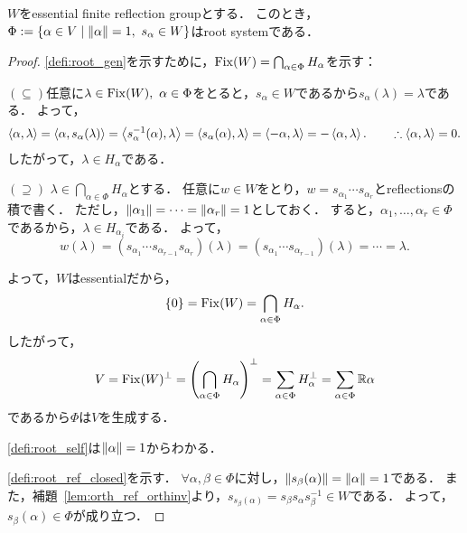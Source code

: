 \begin{prop} \label{prop:frg_to_root}
  $W$をessential finite reflection groupとする．
  このとき，$\Phi := \set{\alpha \in V}{\norm{\alpha} = 1,\ s_\alpha \in W}$はroot systemである．
\end{prop}
\begin{proof}
  \ref{defi:root_gen}を示すために，$\operatorname{Fix} (W) = \bigcap_{\alpha \in \Phi} H_\alpha$を示す：

  $(\subseteq)$任意に$\lambda \in \operatorname{Fix}(W),\ \alpha \in \Phi$をとると，$s_\alpha \in W$であるから$s_\alpha(\lambda) = \lambda$である．
  よって，
  \begin{equation}
    \left\langle \alpha, \lambda \right\rangle
    = \left\langle \alpha, s_\alpha(\lambda) \right\rangle
    = \left\langle s_\alpha^{-1}(\alpha), \lambda \right\rangle
    = \left\langle s_\alpha(\alpha), \lambda \right\rangle
    = \left\langle -\alpha, \lambda \right\rangle
    = -\left\langle \alpha, \lambda \right\rangle.
    \qquad \therefore \left\langle \alpha, \lambda \right\rangle = 0.
  \end{equation}
  したがって，$\lambda \in H_\alpha$である．

  $(\supseteq)$ $\lambda \in \bigcap_{\alpha \in \Phi} H_\alpha$とする．
  任意に$w \in W$をとり，$w = s_{\alpha_1} \cdots s_{\alpha_r}$とreflectionsの積で書く．
  ただし，$\left\| \alpha_1 \right\| = \cdots = \left\| \alpha_r \right\| = 1$としておく．
  すると，$\alpha_1, \ldots, \alpha_r \in \Phi$であるから，$\lambda \in H_{\alpha_i}$である．
  よって，
  \begin{equation}
    w(\lambda)
    = (s_{\alpha_1} \cdots s_{\alpha_{r-1}} s_{\alpha_r})(\lambda)
    = (s_{\alpha_1} \cdots s_{\alpha_{r-1}})(\lambda)
    = \cdots
    = \lambda.
  \end{equation}

  よって，$W$はessentialだから，
  \begin{equation}
    \{0\}
    = \operatorname{Fix}(W)
    = \bigcap_{\alpha \in \Phi} H_\alpha.
  \end{equation}
  したがって，
  \begin{equation}
    V
    = \operatorname{Fix}(W)^\perp
    = \left( \bigcap_{\alpha \in \Phi} H_\alpha \right)^\perp
    = \sum_{\alpha \in \Phi} H_\alpha^\perp
    = \sum_{\alpha \in \Phi} \mathbb{R}\alpha
  \end{equation}
  であるから$\Phi$は$V$を生成する．

  \ref{defi:root_self}は$\left\| \alpha \right\| = 1$からわかる．

  \ref{defi:root_ref_closed}を示す．
  $\forall \alpha, \beta \in \Phi$に対し，$\left\| s_\beta(\alpha) \right\| = \left\| \alpha \right\| = 1$である．
  また，補題~\ref{lem:orth_ref_orthinv}より，$s_{s_\beta(\alpha)} = s_\beta s_\alpha s_\beta^{-1} \in W$である．
  よって，$s_\beta(\alpha) \in \Phi$が成り立つ．
\end{proof}

